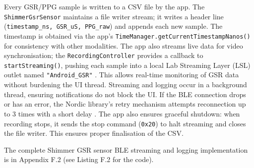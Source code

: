Every GSR/PPG sample is written to a CSV file by the app. The \texttt{ShimmerGsrSensor} maintains a file writer stream; it writes a header line (\texttt{timestamp\_ns, GSR\_uS, PPG\_raw}) and appends each new sample. The timestamp is obtained via the app's \texttt{TimeManager.getCurrentTimestampNanos()} for consistency with other modalities. The app also streams live data for video synchronisation; the \texttt{RecordingController} provides a callback to \texttt{startStreaming()}, pushing each sample into a local Lab Streaming Layer (LSL) outlet named \texttt{"Android\_GSR"} \cite{ref9}. This allows real-time monitoring of GSR data without burdening the UI thread. Streaming and logging occur in a background thread, ensuring notifications do not block the UI. If the BLE connection drops or has an error, the Nordic library's retry mechanism attempts reconnection up to 3 times with a short delay \cite{ref14}. The app also ensures graceful shutdown: when recording stops, it sends the stop command (\texttt{0x20}) to halt streaming \cite{ref15} and closes the file writer. This ensures proper finalisation of the CSV.

The complete Shimmer GSR sensor BLE streaming and logging implementation is in Appendix F.2 (see Listing F.2 for the code).

